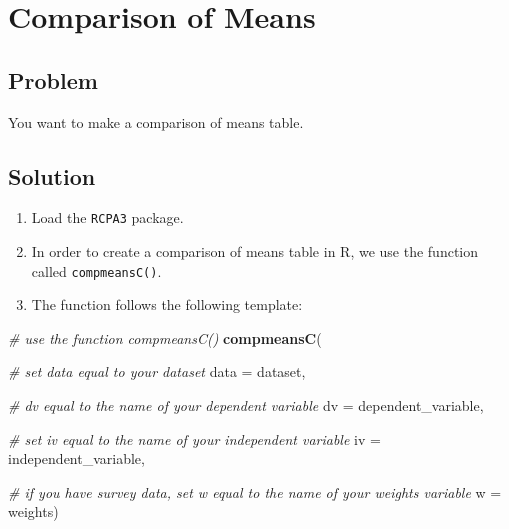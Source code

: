 \documentclass[
]{book}
\newenvironment{Shaded}{\begin{snugshade}}{\end{snugshade}}
\newcommand{\AttributeTok}[1]{\textcolor[rgb]{0.13,0.29,0.53}{#1}}
\newcommand{\CommentTok}[1]{\textcolor[rgb]{0.56,0.35,0.01}{\textit{#1}}}
\newcommand{\FunctionTok}[1]{\textcolor[rgb]{0.13,0.29,0.53}{\textbf{#1}}}
\newcommand{\NormalTok}[1]{#1}
\providecommand{\tightlist}{%
  \setlength{\itemsep}{0pt}\setlength{\parskip}{0pt}}
\begin{document}
\hypertarget{compmeans}{%
\section{Comparison of Means}\label{compmeans}}

\hypertarget{problem-39}{%
\subsection{Problem}\label{problem-39}}

You want to make a comparison of means table.

\hypertarget{solution-38}{%
\subsection{Solution}\label{solution-38}}

\begin{enumerate}
\def\labelenumi{\arabic{enumi}.}
\tightlist
\item
  Load the \texttt{RCPA3} package.
\item
  In order to create a comparison of means table in R, we use the function called \texttt{compmeansC()}.\\
\item
  The function follows the following template:
\end{enumerate}

\begin{Shaded}
\begin{Highlighting}[]
\CommentTok{\# use the function \textasciigrave{}compmeansC()}
\FunctionTok{compmeansC}\NormalTok{(}
  
  \CommentTok{\# set \textasciigrave{}data\textasciigrave{} equal to your dataset}
  \AttributeTok{data =}\NormalTok{ dataset,}
  
  \CommentTok{\# \textasciigrave{}dv\textasciigrave{} equal to the name of your dependent variable}
  \AttributeTok{dv =}\NormalTok{ dependent\_variable, }
  
  \CommentTok{\# set \textasciigrave{}iv\textasciigrave{} equal to the name of your independent variable}
  \AttributeTok{iv =}\NormalTok{ independent\_variable, }
  
  \CommentTok{\# if you have survey data, set \textasciigrave{}w\textasciigrave{} equal to the name of your weights variable}
  \AttributeTok{w =}\NormalTok{ weights)}
\end{Highlighting}
\end{Shaded}
\end{document}
